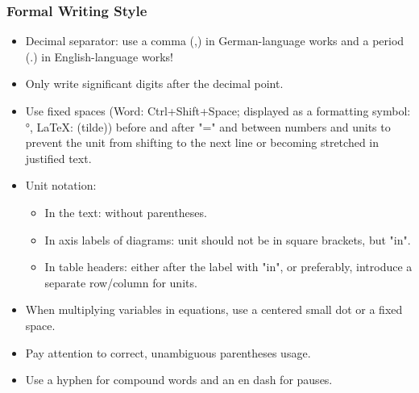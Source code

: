 \subsubsection{Formal Writing Style}
\label{sec:formal_writing_style}

\begin{itemize}
    \item Decimal separator: use a comma (,) in German-language works and a period (.) in English-language works!
    \item Only write significant digits after the decimal point.
    \item Use fixed spaces (Word: Ctrl+Shift+Space; displayed as a formatting symbol: °, LaTeX: \raisebox{-0.8ex}{\~{}} (tilde)) before and after "=" and between numbers and units to prevent the unit from shifting to the next line or becoming stretched in justified text.
    \item Unit notation:
    \begin{itemize}
        \item In the text: without parentheses.
        \item In axis labels of diagrams: unit should not be in square brackets, but "in".
        \item In table headers: either after the label with "in", or preferably, introduce a separate row/column for units.
    \end{itemize}
    \item When multiplying variables in equations, use a centered small dot or a fixed space.
    \item Pay attention to correct, unambiguous parentheses usage.
    \item Use a hyphen for compound words and an en dash for pauses.
\end{itemize}